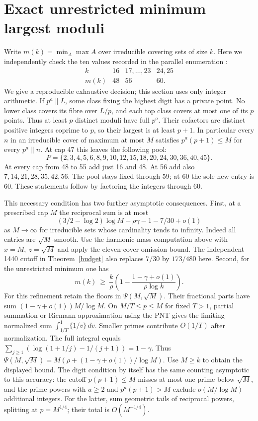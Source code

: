 \documentclass[10pt]{article}
\begin{document}
\section{Exact unrestricted minimum largest moduli}
Write $m(k)=\min_A\max A$ over irreducible covering sets of size $k$. Here we independently check the ten values recorded in the parallel enumeration \cite{parallel}:
\[
 \begin{array}{c|ccc}
 k&16&17,\dots,23&24,25\\ \hline
 m(k)&48&56&60.
 \end{array}
\]
We give a reproducible exhaustive decision; this section uses only integer arithmetic. If $p^a\parallel L$, some class fixing the highest digit has a private point. No lower class covers its fibre over $L/p$, and each top class covers at most one of its $p$ points. Thus at least $p$ distinct moduli have full $p^a$. Their cofactors are distinct positive integers coprime to $p$, so their largest is at least $p+1$. In particular every $n$ in an irreducible cover of maximum at most $M$ satisfies $p^a(p+1)\le M$ for every $p^a\parallel n$. At cap 47 this leaves the following pool:
\[
 P=\{2,3,4,5,6,8,9,10,12,15,18,20,24,30,36,40,45\}.
\]
At every cap from 48 to 55 add just 16 and 48. At 56 add also $7,14,21,28,35,42,56$. The pool stays fixed through 59; at 60 the sole new entry is 60. These statements follow by factoring the integers through 60.

This necessary condition has two further asymptotic consequences. First, at a prescribed cap $M$ the reciprocal sum is at most
\[
 (3/2-\log2)\log M+\rho\gamma-1-7/30+o(1)
\]
as $M\to\infty$ for irreducible sets whose cardinality tends to infinity. Indeed all entries are $\sqrt M$-smooth. Use the harmonic-mass computation above with $x=M,\ z=\sqrt M$ and apply the eleven-cover omission bound. The independent 1440 cutoff in Theorem~\ref{budget} also replaces $7/30$ by $173/480$ here. Second, for the unrestricted minimum one has
\[
 m(k)\ \ge\ \frac{k}{\rho}\left(1-\frac{1-\gamma+o(1)}{\rho\log k}\right).
\]
For this refinement retain the floors in $\Psi(M,\sqrt M)$. Their fractional parts have sum $(1-\gamma+o(1))M/\log M$. On $M/T\le p\le M$ for fixed $T>1$, partial summation or Riemann approximation using the PNT gives the limiting normalized sum $\int_{1/T}^1\{1/v\}\,dv$. Smaller primes contribute $O(1/T)$ after normalization. The full integral equals $\sum_{j\ge1}(\log(1+1/j)-1/(j+1))=1-\gamma$. Thus $\Psi(M,\sqrt M)=M(\rho+(1-\gamma+o(1))/\log M)$. Use $M\ge k$ to obtain the displayed bound. The digit condition by itself has the same counting asymptotic to this accuracy: the cutoff $p(p+1)\le M$ misses at most one prime below $\sqrt M$, and the prime powers with $a\ge2$ and $p^a(p+1)>M$ exclude $o(M/\log M)$ additional integers. For the latter, sum geometric tails of reciprocal powers, splitting at $p=M^{1/4}$; their total is $O(M^{-1/4})$.
\end{document}
